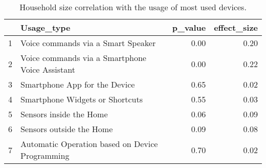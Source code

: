 \begin{table}[ht]
\centering
\begin{tabular}{rlrr}
  \hline
 & Usage\_type & p\_value & effect\_size \\ 
  \hline
1 & Voice commands via a Smart Speaker & 0.00 & 0.20 \\ 
  2 & Voice commands via a Smartphone Voice Assistant & 0.00 & 0.22 \\ 
  3 & Smartphone App for the Device & 0.65 & 0.02 \\ 
  4 & Smartphone Widgets or Shortcuts & 0.55 & 0.03 \\ 
  5 & Sensors inside the Home & 0.06 & 0.09 \\ 
  6 & Sensors outside the Home & 0.09 & 0.08 \\ 
  7 & Automatic Operation based on Device Programming & 0.70 & 0.02 \\ 
   \hline
\end{tabular}
\caption{Household size correlation with the usage of most used devices.} 
\end{table}
